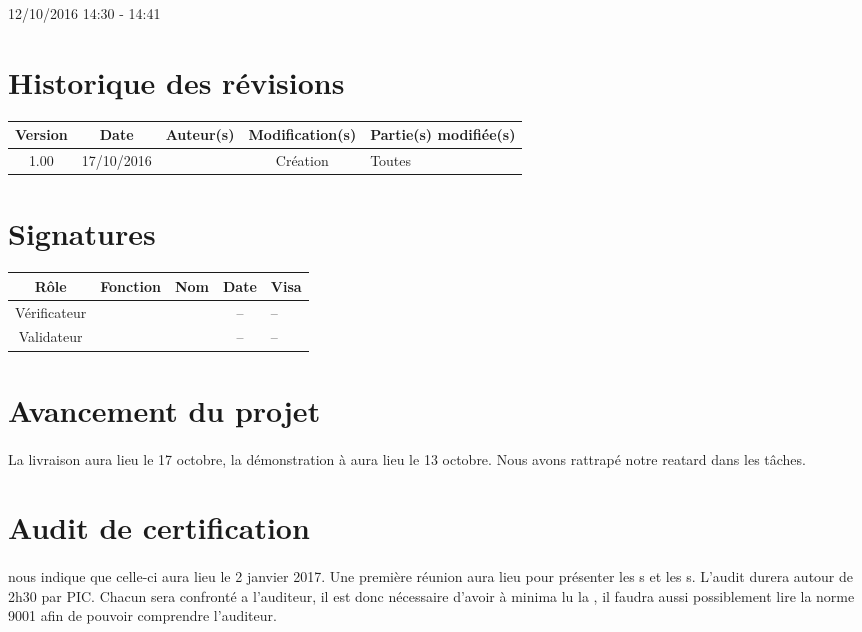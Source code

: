 \documentclass [a4paper] {article}
\begin{document}
\rhead{}

12/10/2016
\hfill   
\hfill 	14:30 - 14:41 				%



\section*{Historique des révisions}
\begin{center}
			\begin{tabular}{| c | c | c | c | p{4cm} |}
				\hline
				\rowcolor{Gray}
				Version & Date & Auteur(s) & Modification(s) & Partie(s) modifiée(s)		 \\
				\hline
				1.00 & 17/10/2016 & \Kafui & Création & Toutes \\
		\hline		
			\end{tabular}
		\end{center}

\section*{Signatures}

		\begin{center}
			\begin{tabular}{| c | c | c | c | p{4cm} |}
				\hline
				\rowcolor{Gray}
				Rôle & Fonction & Nom & Date & Visa		 \\
				\hline
				Vérificateur & \RGC & \Melissa & -- & -- \\[30pt]
				\hline
				Validateur & \CP & \Pierre & -- & -- \\[30pt]	
				\hline
			\end{tabular}
		\end{center}


\section{Avancement du projet}
\paragraph*{}
La livraison aura lieu le 17 octobre, la démonstration à \nomTuteurPedago{} aura lieu le 13 octobre. Nous avons rattrapé notre reatard dans les tâches. 

\section{Audit de certification}
\paragraph*{}
\nomTuteurQualite{} nous indique que celle-ci aura lieu le 2 janvier 2017. Une première réunion aura lieu pour présenter les \RQ s et les \CP s. L'audit durera autour de 2h30 par PIC.
Chacun sera confronté a l'auditeur, il est donc nécessaire d'avoir à minima lu la , il faudra aussi possiblement lire la norme 9001 afin de pouvoir comprendre l'auditeur.
\end{document}
